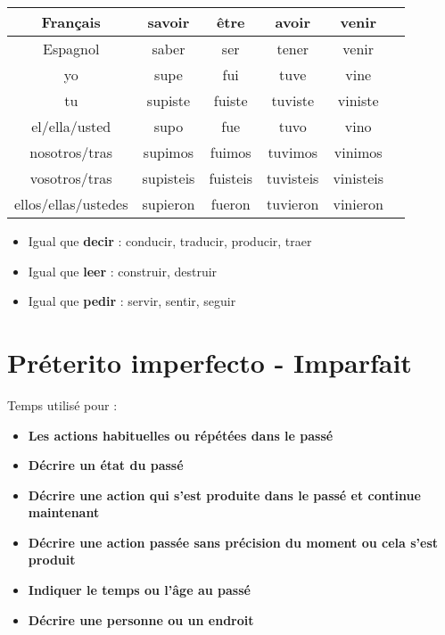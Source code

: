 \begin{table}[hbt!]
    \centering
    \setlength\tabcolsep{25pt}
    \begin{tabular}{|c||c|c|c|c|c|}
         \hline
         Français               & \textcolor{BrickRed}{savoir} & \textcolor{BrickRed}{être} & \textcolor{BrickRed}{avoir} & \textcolor{BrickRed}{venir} \\
         \hline
         Espagnol               & \textcolor{electricultramarine}{saber} & \textcolor{electricultramarine}{ser} & \textcolor{electricultramarine}{tener} & \textcolor{electricultramarine}{venir} \\
         \hline
         \hline
         yo                     & supe            & fui         & tuve        & vine     \\    
         \hline
         tu                     & supiste         & fuiste      & tuviste     & viniste  \\
         \hline
         el/ella/usted          & supo           & fue         & tuvo         & vino     \\
        \hline
        nosotros/tras           & supimos         & fuimos      & tuvimos      & vinimos  \\
        \hline
        vosotros/tras           & supisteis       & fuisteis    & tuvisteis    & vinisteis \\
        \hline
        ellos/ellas/ustedes     & supieron        & fueron      & tuvieron     & vinieron   \\
        \hline
    \end{tabular}
    \label{tab:label2}
\end{table}
\begin{itemize}
    \item Igual que \textbf{decir} : conducir, traducir, producir, traer
    \item Igual que \textbf{leer} : construir, destruir
    \item Igual que \textbf{pedir} : servir, sentir, seguir
\end{itemize}
\newpage
\section{Préterito imperfecto - Imparfait}
Temps utilisé pour : 
\begin{itemize}
    \item \textbf{Les actions habituelles ou répétées dans le passé}
    \item \textbf{Décrire un état du passé}
    \item \textbf{Décrire une action qui s'est produite dans le passé et continue maintenant}
    \item \textbf{Décrire une action passée sans précision du moment ou cela s'est produit}
    \item \textbf{Indiquer le temps ou l'âge au passé}
    \item \textbf{Décrire une personne ou un endroit}
\end{itemize}
